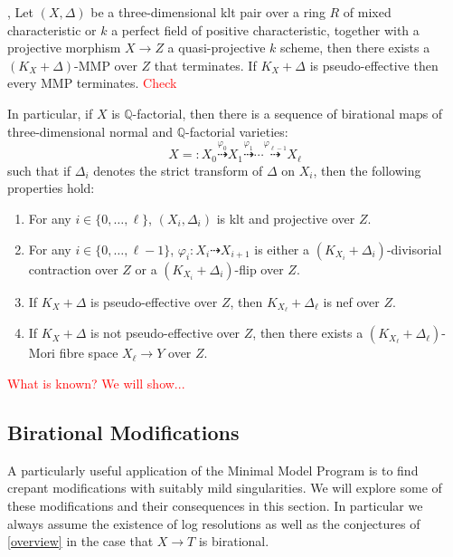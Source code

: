 \documentclass[a4paper,12pt]{book}
\newcommand\myworries[1]{\textcolor{red}{#1}}
\begin{document}
	\begin{theorem}\cite[Theorem 1.7]{BW17}, \cite[Theorem 1.2]{BW17}\cite[Theorem F]{bhatt2020}\label{MMP}
	Let $(X, \Delta)$ be a three-dimensional klt pair over a ring $R$ of mixed characteristic or $k$ a perfect field of positive characteristic, together with a projective morphism $X \to Z$ a quasi-projective $k$ scheme, then there exists a $(K_X+\Delta)$-MMP over $Z$ that terminates. If $K_{X}+\Delta$ is pseudo-effective then every MMP terminates. \myworries{Check}
	
	In particular, if $X$ is $\mathbb{Q}$-factorial, then 
	there is a sequence of birational maps of three-dimensional normal and $\mathbb{Q}$-factorial varieties:  
	\[
	X=:X_0 \overset{\varphi_0}{\dashrightarrow} X_1 \overset{\varphi_1}{\dashrightarrow} \cdots \overset{\varphi_{\ell-1}}{\dashrightarrow} X_{\ell}
	\]
	such that if $\Delta_i$ denotes the strict transform of $\Delta$ on $X_i$, then
	the following properties hold:  
	\begin{enumerate}
		\item 
		For any $i \in \{0, \ldots, \ell\}$, 
		$(X_i, \Delta_i)$ is klt and projective over $Z$.
		\item 
		For any $i \in \{0, \ldots, \ell-1\}$, 
		$\varphi_i\colon X_i \dashrightarrow X_{i+1}$ is either a $(K_{X_i}+\Delta_i)$-divisorial contraction over $Z$ or a $(K_{X_i}+\Delta_i)$-flip over $Z$. 
		\item 
		If $K_X+\Delta$ is pseudo-effective over $Z$, then $K_{X_{\ell}}+\Delta_{\ell}$ is nef over $Z$. 
		\item 
		If $K_X+\Delta$ is not pseudo-effective over $Z$, then 
		there exists a $(K_{X_{\ell}}+\Delta_{\ell})$-Mori fibre space $X_{\ell} \to Y$ over $Z$. 
	\end{enumerate}
\end{theorem}


\myworries{What is known? We will show...}


\subsection{Birational Modifications}

A particularly useful application of the Minimal Model Program is to find crepant modifications with suitably mild singularities. We will explore some of these modifications and their consequences in this section. In particular we always assume the existence of log resolutions as well as the conjectures of \autoref{overview} in the case that $X \to T$ is birational.
\end{document}
